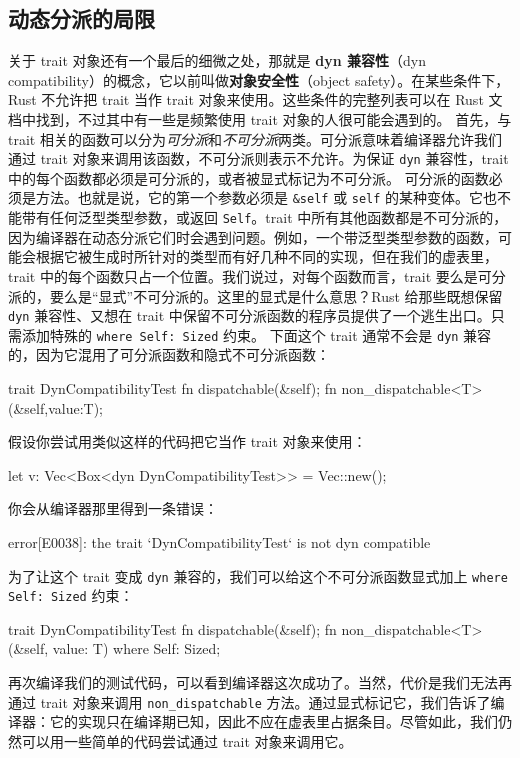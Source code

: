 \subsection{动态分派的局限}
\label{idx:idx_9fb963b2}
\label{idx:idx_e4ad449b}
\label{idx:idx_edb48e35}
关于 trait 对象还有一个最后的细微之处，那就是 \textbf{dyn 兼容性}（dyn compatibility）的概念，它以前叫做\textbf{对象安全性}（object safety）。在某些条件下，Rust 不允许把 trait 当作 trait 对象来使用。这些条件的完整列表可以在 Rust 文档中找到，不过其中有一些是频繁使用 trait 对象的人很可能会遇到的。
首先，与 trait 相关的函数可以分为\emph{可分派}和\emph{不可分派}两类。可分派意味着编译器允许我们通过 trait 对象来调用该函数，不可分派则表示不允许。为保证 \texttt{dyn} 兼容性，trait 中的每个函数都必须是可分派的，或者被显式标记为不可分派。
可分派的函数必须是方法。也就是说，它的第一个参数必须是 \texttt{\&self} 或 \texttt{self} 的某种变体。它也不能带有任何泛型类型参数，或返回 \texttt{Self}。trait 中所有其他函数都是不可分派的，因为编译器在动态分派它们时会遇到问题。例如，一个带泛型类型参数的函数，可能会根据它被生成时所针对的类型而有好几种不同的实现，但在我们的虚表里，trait 中的每个函数只占一个位置。我们说过，对每个函数而言，trait 要么是可分派的，要么是“显式”不可分派的。这里的显式是什么意思？Rust 给那些既想保留 \texttt{dyn} 兼容性、又想在 trait 中保留不可分派函数的程序员提供了一个逃生出口。只需添加特殊的
\texttt{where Self: Sized} 约束。
下面这个 trait 通常不会是 \texttt{dyn} 兼容的，因为它混用了可分派函数和隐式不可分派函数：
\begin{codebox}[rust]
trait DynCompatibilityTest {
      fn dispatchable(&self);
      fn non_dispatchable<T>(&self,value:T);
}
\end{codebox}
假设你尝试用类似这样的代码把它当作 trait 对象来使用：
\begin{codebox}[rust]
let v: Vec<Box<dyn DynCompatibilityTest>> = Vec::new();
\end{codebox}
你会从编译器那里得到一条错误：
\begin{codebox}[rust]
error[E0038]: the trait `DynCompatibilityTest` is not dyn compatible
\end{codebox}
为了让这个 trait 变成 \texttt{dyn} 兼容的，我们可以给这个不可分派函数显式加上 \texttt{where Self: Sized} 约束：
\begin{codebox}[rust]
trait DynCompatibilityTest {
      fn dispatchable(&self);
      fn non_dispatchable<T>(&self, value: T) where Self: Sized;
}
\end{codebox}
\label{idx:idx_6d4990ca}
再次编译我们的测试代码，可以看到编译器这次成功了。当然，代价是我们无法再通过 trait 对象来调用 \texttt{non\_\allowbreak{}dispatchable} 方法。通过显式标记它，我们告诉了编译器：它的实现只在编译期已知，因此不应在虚表里占据条目。尽管如此，我们仍然可以用一些简单的代码尝试通过 trait 对象来调用它。
